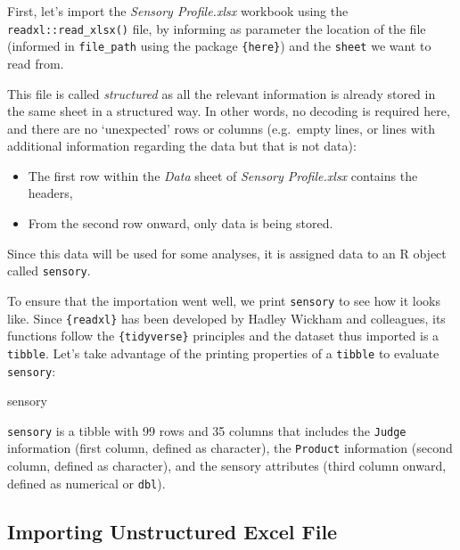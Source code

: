 \documentclass[
]{book}
\newenvironment{Shaded}{\begin{snugshade}}{\end{snugshade}}
\newcommand{\NormalTok}[1]{#1}
\providecommand{\tightlist}{%
  \setlength{\itemsep}{0pt}\setlength{\parskip}{0pt}}
\begin{document}
First, let's import the \emph{Sensory Profile.xlsx} workbook using the \texttt{readxl::read\_xlsx()} file, by informing as parameter the location of the file (informed in \texttt{file\_path} using the package \texttt{\{here\}}) and the \texttt{sheet} we want to read from.

This file is called \emph{structured} as all the relevant information is already stored in the same sheet in a structured way. In other words, no decoding is required here, and there are no `unexpected' rows or columns (e.g.~empty lines, or lines with additional information regarding the data but that is not data):

\begin{itemize}
\tightlist
\item
  The first row within the \emph{Data} sheet of \emph{Sensory Profile.xlsx} contains the headers,\\
\item
  From the second row onward, only data is being stored.
\end{itemize}

Since this data will be used for some analyses, it is assigned data to an R object called \texttt{sensory}.

To ensure that the importation went well, we print \texttt{sensory} to see how it looks like. Since \texttt{\{readxl\}} has been developed by Hadley Wickham and colleagues, its functions follow the \texttt{\{tidyverse\}} principles and the dataset thus imported is a \texttt{tibble}. Let's take advantage of the printing properties of a \texttt{tibble} to evaluate \texttt{sensory}:

\begin{Shaded}
\begin{Highlighting}[]
\NormalTok{sensory}
\end{Highlighting}
\end{Shaded}

\texttt{sensory} is a tibble with 99 rows and 35 columns that includes the \texttt{Judge} information (first column, defined as character), the \texttt{Product} information (second column, defined as character), and the sensory attributes (third column onward, defined as numerical or \texttt{dbl}).

\hypertarget{importing-unstructured-excel-file}{%
\subsection{Importing Unstructured Excel File}\label{importing-unstructured-excel-file}}
\end{document}
